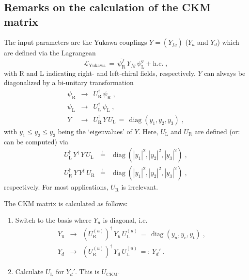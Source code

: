 \documentclass[12pt,a4paper,twoside]{scrartcl}
\DeclareMathOperator{\diag}{diag}
\numberwithin{equation}{section}
\numberwithin{table}{section}
\begin{document}
\subsection{Remarks on the calculation of the CKM matrix}

The input parameters are the Yukawa couplings $Y=(Y_{fg})$ ($Y_u$ and $Y_d$) 
which are defined via the Lagrangean
\begin{equation}
 \mathscr{L}_\mathrm{Yukawa}
 \,=\,
 \overline{\psi_\mathrm{R}^f}\,Y_{fg}\,\psi_\mathrm{L}^g
 +\text{h.c.}\;,
\end{equation}
with R and L indicating right- and left-chiral fields, respectively.  $Y$ can
always be diagonalized by a bi-unitary transformation
\begin{subequations}
\begin{eqnarray}
 \psi_\mathrm{R} & \to & U_\mathrm{R}^\dagger\,\psi_\mathrm{R}\;,\\
 \psi_\mathrm{L} & \to & U_\mathrm{L}^\dagger\,\psi_\mathrm{L}\;,\\
 Y & \to & 
 U_\mathrm{R}^\dagger\,Y\,U_\mathrm{L}
 \,=\,
 \diag(y_1,y_2,y_3)\;,
 \end{eqnarray}
\end{subequations}
with $y_1\le y_2\le y_3$ being the `eigenvalues' of $Y$. Here, $U_\mathrm{L}$
and $U_\mathrm{R}$ are defined (or: can be computed) via
\begin{subequations}
\begin{eqnarray}
 U_\mathrm{L}^\dagger\,Y^\dagger\,Y\,U_\mathrm{L}
 & \stackrel{!}{=} & 
 \diag \left(|y_1|^2,|y_2|^2,|y_3|^2\right)\;,\\
 U_\mathrm{R}^\dagger\,Y\,Y^\dagger\,U_\mathrm{R}
 & \stackrel{!}{=} & 
 \diag \left(|y_1|^2,|y_2|^2,|y_3|^2\right)\;,
\end{eqnarray}
\end{subequations}
respectively. For most applications, $U_\mathrm{R}$ is irrelevant. 

The CKM matrix is calculated as follows:
\begin{enumerate}
 \item Switch to the basis where $Y_u$ is diagonal, i.e.
 \begin{subequations}
 \begin{eqnarray}
  Y_u & \to & (U_\mathrm{R}^{(u)})^\dagger\,Y_u\,U_\mathrm{L}^{(u)}
  \,=\,\diag(y_u,y_c,y_t)\;,\\
  Y_d & \to & (U_\mathrm{R}^{(u)})^\dagger\,Y_d\,U_\mathrm{L}^{(u)}
  \,=:\, Y_d'\;.
 \end{eqnarray}
 \end{subequations}
 \item Calculate $U_\mathrm{L}$ for $Y_d'$. This is $U_\mathrm{CKM}$.
\end{enumerate}
\end{document}
